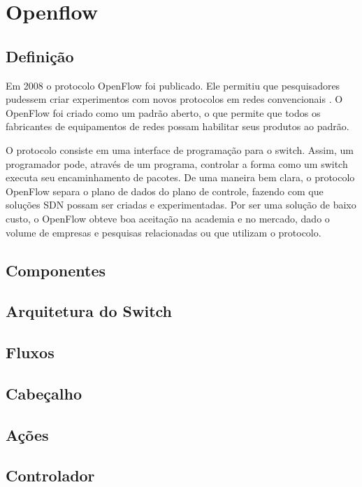 \section{Openflow}



\subsection{Definição}

Em 2008 o protocolo OpenFlow foi publicado. Ele permitiu que pesquisadores
pudessem criar experimentos com novos protocolos em redes convencionais
\citep{nick2008openflow}.
O OpenFlow foi criado como um padrão aberto, o que permite que todos os 
fabricantes de equipamentos de redes possam habilitar seus produtos ao 
padrão.

O protocolo consiste em uma interface de programação para o switch. 
Assim, um programador pode, através de um programa, controlar a forma como 
um switch executa seu encaminhamento de pacotes. 
De uma maneira bem clara, o protocolo OpenFlow separa o plano de dados
do plano de controle, fazendo com que soluções SDN possam ser criadas 
e experimentadas.
Por ser uma solução de baixo custo, o OpenFlow obteve boa aceitação na 
academia e no mercado, dado o volume de empresas e pesquisas relacionadas
ou que utilizam o protocolo.

\subsection{Componentes}


\subsection{Arquitetura do Switch}

\subsection{Fluxos}

\subsection{Cabeçalho}

\subsection{Ações}

\subsection{Controlador}
